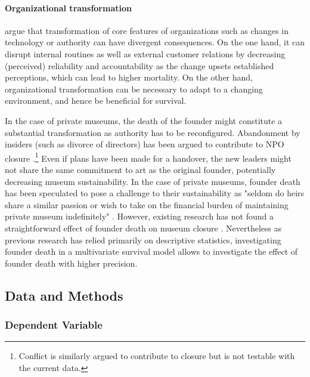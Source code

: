 \documentclass[12pt]{article}
\begin{document}
\paragraph*{Organizational transformation}

\textcite{Carroll_Khessina_2019_demography} argue that transformation of core features of organizations such as changes in technology or authority can have divergent consequences. 
On the one hand, it can disrupt internal routines as well as external customer relations by decreasing (perceived) reliability and accountability as the change upsets established perceptions, which can lead to higher mortality. 
On the other hand, organizational transformation can be necessary to adapt to a changing environment, and hence be beneficial for survival.



In the case of private museums, the death of the founder might constitute a substantial transformation as authority has to be reconfigured.
Abandonment by insiders (such as divorce of directors) has been argued to contribute to NPO closure \parencite{Duckles_Hager_Galaskiewicz_2005_close}.\footnote{Conflict is similarly argued to contribute to closure but is not testable with the current data.}
Even if plans have been made for a handover, the new leaders might not share the same commitment to art as the original founder, potentially decreasing museum sustainability. 
In the case of private museums, founder death has been speculated to pose a challenge to their sustainability as "seldom do heirs share a similar passion or wish to take on the financial burden of maintaining private museum indefinitely" \parencite[p.234]{Walker_2019_collector}.
However, existing research has not found a straightforward effect of founder death on museum closure \parencite{Velthuis_Gera_forthcoming_fragility,Velthuis_etal_2023_boom}.
Nevertheless as previous research has relied primarily on descriptive statistics, investigating founder death in a multivariate survival model allows to investigate the effect of founder death with higher precision.
\bigbreak
\noindent





\subsection*{Data and Methods}


\subsubsection*{Dependent Variable}
\end{document}
